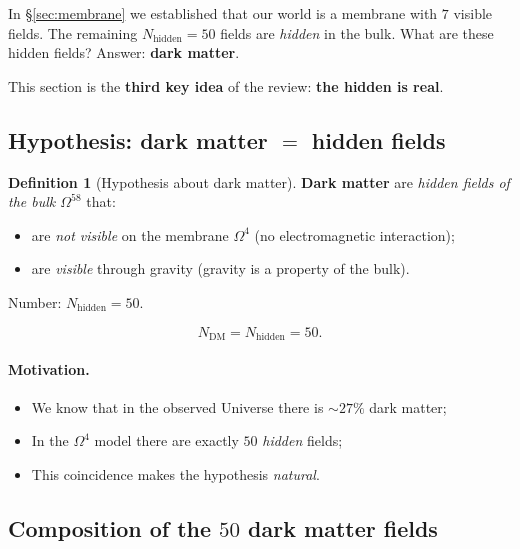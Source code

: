 \documentclass[11pt,a4paper]{article}
\newcommand{\Om}{\Omega^4}
\newcommand{\Omfi}{\Omega^{58}}
\newcommand{\Nhidden}{N_{\text{hidden}}}
\theoremstyle{definition}
\newtheorem{definition}[theorem]{Definition}
\begin{document}
In §\ref{sec:membrane} we established that our world is a membrane 
with $7$ visible fields. The remaining $\Nhidden = 50$ fields 
are \emph{hidden} in the bulk. What are these hidden fields? 
Answer: \textbf{dark matter}.

This section is the \textbf{third key idea} of the review: 
\textbf{the hidden is real}.

\subsection{Hypothesis: dark matter $=$ hidden fields}
\label{subsec:dm-hypothesis}

\begin{definition}[Hypothesis about dark matter]
\label{def:dm-hypothesis}
\textbf{Dark matter} are \emph{hidden fields of the bulk $\Omfi$} 
that:
\begin{itemize}
    \item are \emph{not visible} on the membrane $\Om$ (no electromagnetic 
          interaction);
    \item are \emph{visible} through gravity (gravity is a property 
          of the bulk).
\end{itemize}
Number: $\Nhidden = 50$.
\end{definition}

\begin{equation}
    \boxed{
    N_{\text{DM}} = \Nhidden = 50.
    }
    \label{eq:dm-count}
\end{equation}

\paragraph{Motivation.}
\begin{itemize}
    \item We know that in the observed Universe there is 
          $\sim 27\%$ dark matter;
    \item In the $\Om$ model there are exactly $50$ \emph{hidden} fields;
    \item This coincidence makes the hypothesis \emph{natural}.
\end{itemize}

\subsection{Composition of the $50$ dark matter fields}
\label{subsec:dm-content}
\end{document}
